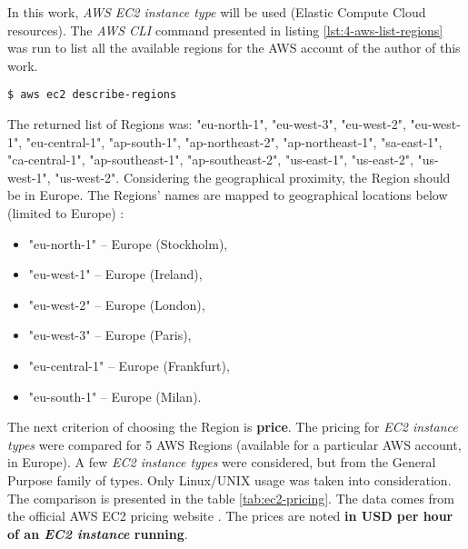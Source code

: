 In this work, \textit{AWS EC2 instance type} will be used (Elastic Compute Cloud resources). The \textit{AWS CLI} command presented in listing \ref{lst:4-aws-list-regions} was run to list all the available regions for the AWS account of the author of this work.
\begin{lstlisting}[basicstyle=\scriptsize,label=lst:4-aws-list-regions,caption={A command of \textit{AWS CLI} tool used to list all the available regions (for an AWS account)}]
$ aws ec2 describe-regions
\end{lstlisting}

The returned list of Regions was: "eu-north-1", "eu-west-3", "eu-west-2", "eu-west-1", "eu-central-1", "ap-south-1", "ap-northeast-2", "ap-northeast-1", "sa-east-1", "ca-central-1", "ap-southeast-1", "ap-southeast-2", "us-east-1", "us-east-2", "us-west-1", "us-west-2". Considering the geographical proximity, the Region should be in Europe. The Regions' names are mapped to geographical locations below (limited to Europe) \cite{aws-region-map}:
\begin{itemize}
\item "eu-north-1" -- Europe (Stockholm),
\item "eu-west-1" -- Europe (Ireland),
\item "eu-west-2" -- Europe (London),
\item "eu-west-3" -- Europe (Paris),
\item "eu-central-1" -- Europe (Frankfurt),
\item "eu-south-1" -- Europe (Milan).
\end{itemize}

The next criterion of choosing the Region is \textbf{price}. The pricing for \textit{EC2 instance types} were compared for 5 AWS Regions (available for a particular AWS account, in Europe). A few \textit{EC2 instance types} were considered, but from the General Purpose family of types. Only Linux/UNIX usage was taken into consideration. The comparison is presented in the table \ref{tab:ec2-pricing}. The data comes from the official AWS EC2 pricing website \cite{ec2-pricing}. The prices are noted \textbf{in USD per hour of an \textit{EC2 instance} running}.

